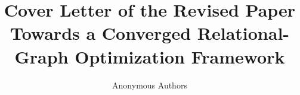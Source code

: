 \documentclass[sigconf,nonacm]{acmart}
\begin{document}
\title{Cover Letter of the Revised Paper \\ Towards a Converged Relational-Graph Optimization Framework}

\author{Anonymous Authors}




\keywords{}

\maketitle


\end{document}
